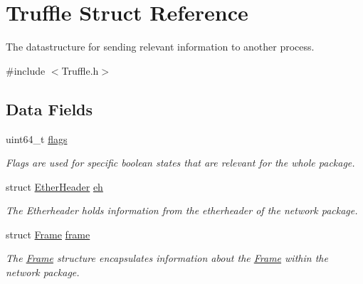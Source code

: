 \hypertarget{struct_truffle}{}\section{Truffle Struct Reference}
\label{struct_truffle}


The datastructure for sending relevant information to another process.  




{\ttfamily \#include $<$Truffle.\+h$>$}

\subsection*{Data Fields}
\begin{DoxyCompactItemize}
\item 
\hypertarget{struct_truffle_a1bc395d944619d99db720a9cd304b279}{}uint64\+\_\+t \hyperlink{struct_truffle_a1bc395d944619d99db720a9cd304b279}{flags}\label{struct_truffle_a1bc395d944619d99db720a9cd304b279}

\begin{DoxyCompactList}\small\item\em Flags are used for specific boolean states that are relevant for the whole package. \end{DoxyCompactList}\item 
\hypertarget{struct_truffle_a8f9ef6e469d9eb375f3e4bf0155c6da2}{}struct \hyperlink{struct_ether_header}{Ether\+Header} \hyperlink{struct_truffle_a8f9ef6e469d9eb375f3e4bf0155c6da2}{eh}\label{struct_truffle_a8f9ef6e469d9eb375f3e4bf0155c6da2}

\begin{DoxyCompactList}\small\item\em The Etherheader holds information from the etherheader of the network package. \end{DoxyCompactList}\item 
\hypertarget{struct_truffle_aa69a97f8982cbbcab85c0d391d0eec0d}{}struct \hyperlink{struct_frame}{Frame} \hyperlink{struct_truffle_aa69a97f8982cbbcab85c0d391d0eec0d}{frame}\label{struct_truffle_aa69a97f8982cbbcab85c0d391d0eec0d}

\begin{DoxyCompactList}\small\item\em The \hyperlink{struct_frame}{Frame} structure encapsulates information about the \hyperlink{struct_frame}{Frame} within the network package. \end{DoxyCompactList}\end{DoxyCompactItemize}


